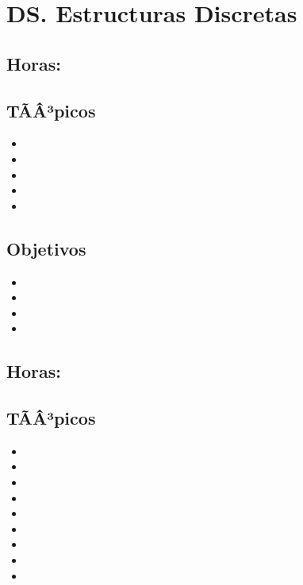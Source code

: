\section{DS. Estructuras Discretas}\label{sec:BOK-DS}
\subsection{\DSUNODef}\label{sec:BOK-DS1}
\subsection*{Horas: \DSUNOHours}

\subsection*{TÃÂ³picos}
\begin{itemize}
	\item \DSUNOTopicFunciones
	\item \DSUNOTopicRelaciones
	\item \DSUNOTopicConjuntos
	\item \DSUNOTopicPrincipio
	\item \DSUNOTopicCardinalidad
\end{itemize}

\subsection*{Objetivos}
\begin{itemize}
	\item \DSUNOObjUNO
	\item \DSUNOObjDOS
	\item \DSUNOObjTRES
	\item \DSUNOObjCUATRO
\end{itemize}

\subsection{\DSDOSDef}\label{sec:BOK-DS2}
\subsection*{Horas: \DSDOSHours}

\subsection*{TÃÂ³picos}
\begin{itemize}
	\item \DSDOSTopicLogica
	\item \DSDOSTopicConectivos
	\item \DSDOSTopicTablas
	\item \DSDOSTopicFormas
	\item \DSDOSTopicValidacion
	\item \DSDOSTopicLogicade
	\item \DSDOSTopicCuantificacion
	\item \DSDOSTopicModus
	\item \DSDOSTopicLimitaciones
\end{itemize}

